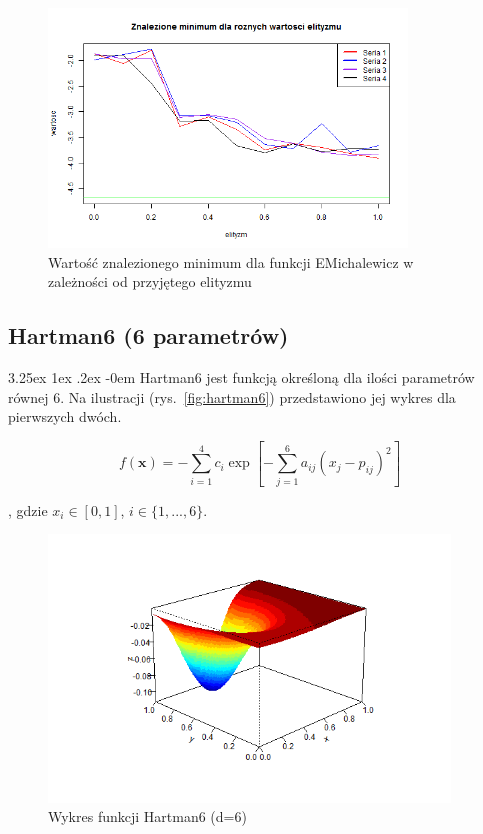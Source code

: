 \documentclass[11pt, a4paper]{article}
\makeatletter
\renewcommand\paragraph{\@startsection{paragraph}{5}{\z@}
  {3.25ex \@plus1ex \@minus.2ex}
  {-0em}
  {\normalfont\normalsize\bfseries}}
\makeatother
\begin{document}
\begin{figure}[H]
	\begin{center}
		\includegraphics[width=0.85\textwidth]{./assets/EMichalewicz6.png}
		\caption{Wartość znalezionego minimum dla funkcji EMichalewicz w zależności od przyjętego elityzmu}
		\label{fig:emichalewicz6}
	\end{center}
\end{figure}

\newpage
\subsection{Hartman6 (6 parametrów)}
\paragraph{}
Hartman6 jest funkcją określoną dla ilości parametrów równej 6. Na ilustracji (rys.~\ref{fig:hartman6}) przedstawiono jej wykres dla pierwszych dwóch.

\begin{equation}\label{eq:hartman6}
f(\boldsymbol{x}) = - \sum_{i=1}^{4} c_i \exp[- \sum_{j=1}^{6} a_{ij}(x_j - p_{ij})^2]
\end{equation}

, gdzie $ x_i \in [0, 1] $, $ i \in \{1, ..., 6\} $.

\begin{figure}[H]
	\begin{center}
		\includegraphics[width=0.95\textwidth]{./assets/Hartman61.png}
		\caption{Wykres funkcji Hartman6 (d=6)}
		\label{fig:hartman61}
	\end{center}
\end{figure}
\end{document}
